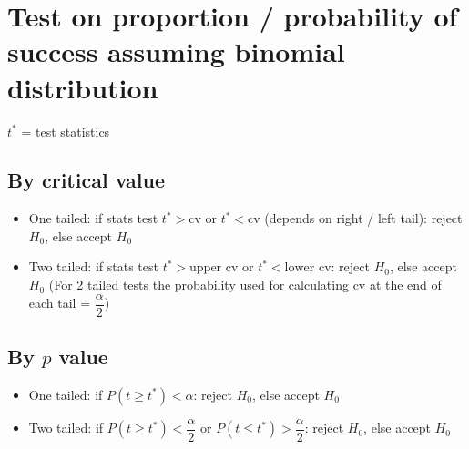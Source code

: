 \documentclass[oneside,fleqn,11pt]{book}
\begin{document}
	\section{Test on proportion / probability of success assuming binomial distribution}
	$t^*$ = test statistics
	\subsection{By critical value}
	\begin{itemize}
		\item One tailed: if stats test $t^* > \text{cv}$ or $t^* < \text{cv}$ (depends on right / left tail): reject $H_0$, else accept $H_0$
		\item Two tailed: if stats test $t^* > \text{upper cv}$ or $t^* < \text{lower cv}$: reject $H_0$, else accept $H_0$ (For 2 tailed tests the probability used for calculating cv at the end of each tail = $\dfrac{\alpha}{2}$)
	\end{itemize}
	
	
	\subsection{By $p$ value}
	\begin{itemize}
		\item One tailed: if $P(t\geq t^*) < \alpha$: reject $H_0$, else accept $H_0$
		\item Two tailed: if $P(t\geq t^*) < \dfrac{\alpha}{2}$ or $P(t\leq t^*) > \dfrac{\alpha}{2}$: reject $H_0$, else accept $H_0$
	\end{itemize}
	

	
\end{document}
